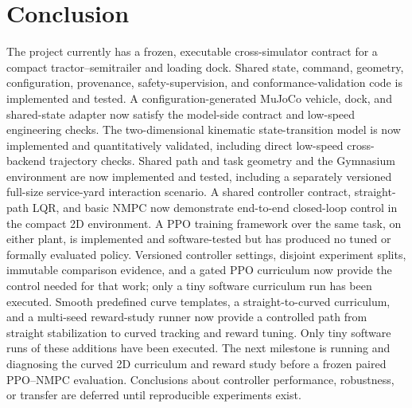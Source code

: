 \section{Conclusion}

The project currently has a frozen, executable cross-simulator contract for a
compact tractor--semitrailer and loading dock. Shared state, command, geometry,
configuration, provenance, safety-supervision, and conformance-validation code
is implemented and tested. A configuration-generated MuJoCo vehicle, dock, and
shared-state adapter now satisfy the model-side contract and low-speed
engineering checks. The two-dimensional kinematic state-transition model is now
implemented and quantitatively validated, including direct low-speed
cross-backend trajectory checks. Shared path and task geometry and the
Gymnasium environment are now implemented and tested, including a separately
versioned full-size service-yard interaction scenario. A shared controller
contract, straight-path LQR, and basic NMPC now demonstrate end-to-end
closed-loop control in the compact 2D environment. A PPO training framework
over the same task, on either plant, is implemented and software-tested but has
produced no tuned or formally evaluated policy. Versioned controller settings,
disjoint experiment splits, immutable comparison evidence, and a gated PPO
curriculum now provide the control needed for that work; only a tiny software
curriculum run has been executed. Smooth predefined curve templates, a
straight-to-curved curriculum, and a multi-seed reward-study runner now provide
a controlled path from straight stabilization to curved tracking and reward
tuning. Only tiny software runs of these additions have been executed. The
next milestone is running and diagnosing the curved 2D curriculum and reward
study before a frozen paired PPO--NMPC evaluation.
Conclusions about controller performance, robustness, or transfer are deferred
until reproducible experiments exist.

